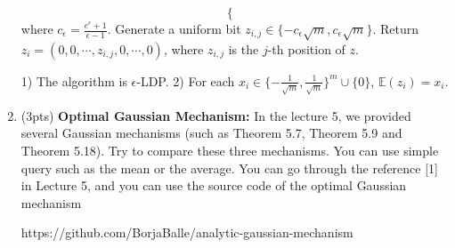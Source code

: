\documentclass[11pt]{article}
\begin{document}
\begin{enumerate}
\begin{algorithm}[!htbp]
\begin{algorithmic}[1]
\begin{equation*}
\begin{cases}
        \end{cases} 
        \end{equation*}
        where $c_\epsilon=\frac{e^\epsilon+1}{\epsilon-1}$. 
        \Else 
        \State Generate a uniform bit $z_{i, j}\in \{-c_\epsilon \sqrt{m}, c_\epsilon \sqrt{m}\}.$
        \EndIf
        \State Return $z_i=(0, 0, \cdots, z_{i, j}, 0, \cdots, 0)$, where $z_{i, j}$ is the $j$-th position of $z$.  
        \EndFor
    \end{algorithmic}
\end{algorithm}

1) The algorithm is $\epsilon$-LDP. 2) For each $x_i\in \{-\frac{1}{\sqrt{m}}, \frac{1}{\sqrt{m}}\}^m \cup \{0\}$, $\mathbb{E}(z_i)=x_i$. 
\item (3pts) \textbf{Optimal Gaussian Mechanism:} In the lecture 5, we provided several Gaussian mechanisms (such as Theorem 5.7, Theorem 5.9 and Theorem 5.18). Try to compare these three mechanisms. You can use simple query such as the mean or the average. You can go through the reference [1] in Lecture 5, and you can use the source code of the optimal Gaussian mechanism 

 {https://github.com/BorjaBalle/analytic-gaussian-mechanism}
 



\end{enumerate}
\end{document}
